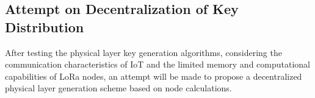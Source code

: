 \subsection{Attempt on Decentralization of Key Distribution}
After testing the physical layer key generation algorithms, considering the communication characteristics of IoT and the limited memory and computational capabilities of LoRa nodes, an attempt will be made to propose a decentralized physical layer generation scheme based on node calculations.